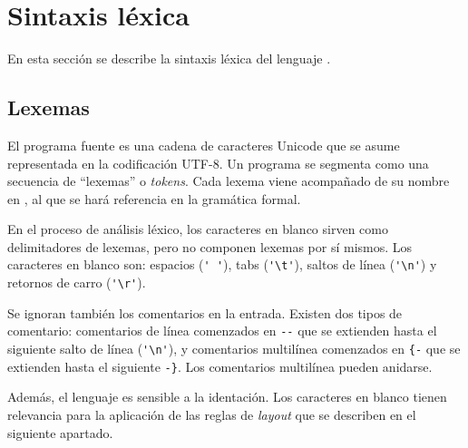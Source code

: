 
\section{Sintaxis léxica}

En esta sección se describe la sintaxis léxica del lenguaje \nuflo.

\subsection{Lexemas}

El programa fuente es una cadena de
caracteres Unicode que se asume representada
en la codificación UTF-8.
Un programa \nuflo se segmenta como una secuencia de
``lexemas'' o {\em tokens}.
Cada lexema viene acompañado de su nombre en ,
al que se hará referencia en la gramática formal.
\bigskip


En el proceso de análisis léxico, los caracteres
en blanco sirven como delimitadores de lexemas,
pero no componen lexemas por sí mismos.
Los caracteres en blanco son:
espacios (\verb|' '|),
tabs (\verb|'\t'|),
saltos de línea (\verb|'\n'|) y
retornos de carro (\verb|'\r'|).

Se ignoran también los comentarios en la entrada.
Existen dos tipos de comentario:
comentarios de línea comenzados en \verb|--| que se extienden hasta el
siguiente salto de línea (\verb|'\n'|),
y comentarios multilínea comenzados en \verb|{-| que se extienden hasta
el siguiente \verb|-}|. Los comentarios multilínea pueden anidarse.

Además, el lenguaje \nuflo es sensible a la identación.
Los caracteres en blanco tienen relevancia para la aplicación de las
reglas de {\em layout} que se describen en el siguiente apartado.
\bigskip


